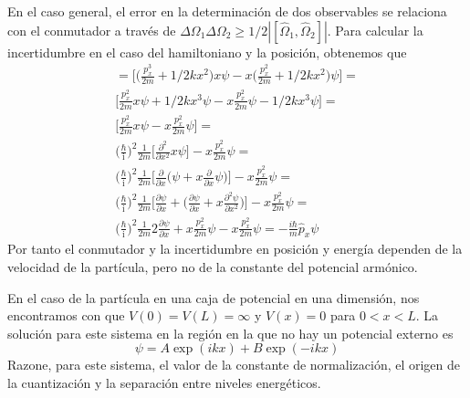 \documentclass[addpoints,spanish, 12pt,a4paper]{exam}
\begin{document}
\begin{questions}
    \begin{solution}
    En el caso general, el error en la determinación
    de dos observables se relaciona con el conmutador
    a través de 
    $\Delta\Omega_1\Delta\Omega_2\geq1/2|[\hat{\Omega}_1,\hat{\Omega}_2]|$. Para calcular la incertidumbre 
    en el caso del hamiltoniano y la posición, obtenemos
    que 
    \begin{align*}
     [\hat{H}_x, \hat{x}] = \bigg[\bigg(\frac{p^3_x}{2m} + 1/2kx^2\bigg)x\psi - x\bigg(\frac{p^2_x}{2m} + 1/2kx^2\bigg)\psi\bigg] = \\
     \bigg[\frac{p^2_x}{2m}x\psi + 1/2kx^3\psi - x\frac{p^2_x}{2m}\psi - 1/2kx^3\psi\bigg]=\\
     \bigg[\frac{p^2_x}{2m}x\psi - x\frac{p^2_x}{2m}\psi\bigg] =\\
     \bigg(\frac{\hbar}{\mathrm{i}}\bigg)^2\frac{1}{2m}
     \bigg[\frac{\partial^2}{\partial x^2}x\psi\bigg] - x\frac{p^2_x}{2m}\psi=\\
    \bigg(\frac{\hbar}{\mathrm{i}}\bigg)^2\frac{1}{2m}
     \bigg[\frac{\partial}{\partial x}\bigg(\psi + x\frac{\partial}{\partial x}\psi\bigg)\bigg] - x\frac{p^2_x}{2m}\psi=\\
     \bigg(\frac{\hbar}{\mathrm{i}}\bigg)^2\frac{1}{2m}
     \bigg[\frac{\partial\psi}{\partial x} +
     \bigg(\frac{\partial\psi}{\partial x} + x\frac{\partial^2\psi}{\partial x^2}\bigg)\bigg] - x\frac{p^2_x}{2m}\psi= \\
     \bigg(\frac{\hbar}{\mathrm{i}}\bigg)^2\frac{1}{2m}
     2\frac{\partial\psi}{\partial x} + x\frac{p^2_x}{2m}\psi - x\frac{p^2_x}{2m}\psi = 
     -\frac{i\hbar}{m}\hat{p}_x\psi 
    \end{align*}
    Por tanto el conmutador y la incertidumbre en
    posición y energía dependen de la velocidad de la
    partícula, pero no de la constante del potencial
    armónico.
        \vspace*{5\baselineskip}
    \end{solution}

    \question[1\half] En el caso de la partícula en una
    caja de potencial en una dimensión, nos encontramos
    con que $V(0)=V(L)=\infty$ y $V(x)=0$ para 
    $0<x<L$. La solución para este sistema en 
    la región en la que no hay un potencial externo es
    \begin{equation*}
        \psi=A\exp(ikx) + B\exp(-ikx) 
    \end{equation*}
    Razone, para este sistema, el valor de la constante
    de normalización, el origen de la cuantización y la
    separación entre niveles energéticos.
    \begin{solution}
        \vspace*{29\baselineskip}
    \end{solution}
    

\end{questions}
\end{document}
